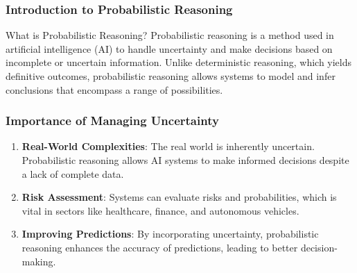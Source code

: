 \documentclass[aspectratio=169]{beamer}
\begin{document}
\frame{\titlepage}

\begin{frame}[fragile]
    \frametitle{Introduction to Probabilistic Reasoning}
    \begin{block}{What is Probabilistic Reasoning?}
        Probabilistic reasoning is a method used in artificial intelligence (AI) to handle uncertainty 
        and make decisions based on incomplete or uncertain information. Unlike deterministic reasoning, 
        which yields definitive outcomes, probabilistic reasoning allows systems to model and infer 
        conclusions that encompass a range of possibilities.
    \end{block}
\end{frame}

\begin{frame}[fragile]
    \frametitle{Importance of Managing Uncertainty}
    \begin{enumerate}
        \item \textbf{Real-World Complexities}:
            The real world is inherently uncertain. Probabilistic reasoning allows AI systems to make informed decisions despite a lack of complete data.
        
        \item \textbf{Risk Assessment}:
            Systems can evaluate risks and probabilities, which is vital in sectors like healthcare, finance, and autonomous vehicles.
        
        \item \textbf{Improving Predictions}:
            By incorporating uncertainty, probabilistic reasoning enhances the accuracy of predictions, leading to better decision-making.
    \end{enumerate}
\end{frame}
\end{document}
